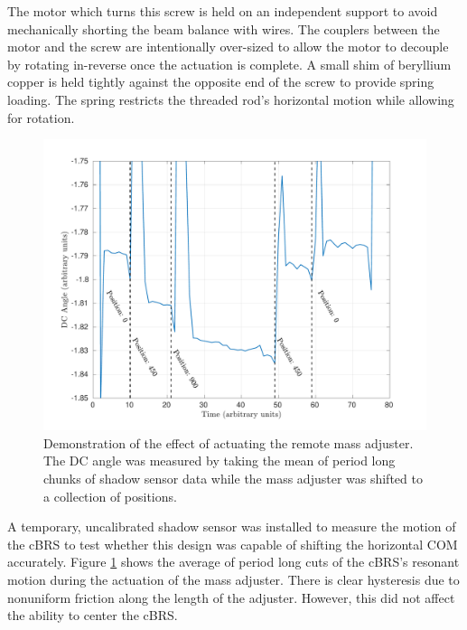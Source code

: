 \documentclass [12pt, proquest]{uwthesis}[2019]
\begin{document}
The motor which turns this screw is held on an independent support to avoid mechanically shorting the beam balance with wires. The couplers between the motor and the screw are intentionally over-sized to allow the motor to decouple by rotating in-reverse once the actuation is complete. A small shim of beryllium copper is held tightly against the opposite end of the screw to provide spring loading. The spring restricts the threaded rod's horizontal motion while allowing for rotation.

\begin{figure}[!h]
\begin{center}
\includegraphics[width=\textwidth]{cBRS_massAdjust.pdf}
\end{center}
\caption[Demonstration of the effect of actuating the remote mass adjuster]{Demonstration of the effect of actuating the remote mass adjuster. The DC angle was measured by taking the mean of period long chunks of shadow sensor data while the mass adjuster was shifted to a collection of positions.}\label{massAdjustPlot}
\end{figure}

A temporary, uncalibrated shadow sensor was installed to measure the motion of the cBRS to test whether this design was capable of shifting the horizontal COM accurately. Figure \ref{massAdjustPlot} shows the average of period long cuts of the cBRS's resonant motion during the actuation of the mass adjuster. There is clear hysteresis due to nonuniform friction along the length of the adjuster. However, this did not affect the ability to center the cBRS. 
\end{document}
